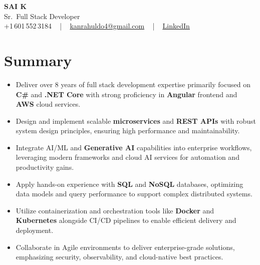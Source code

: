 \documentclass[letterpaper,11pt]{article}
\newcommand{\resumeItem}[1]{
  \item\footnotesize{
    {#1 \vspace{-2pt}}
  }
}
\newcommand{\resumeItemListStart}{\begin{itemize}[leftmargin=*]}
\newcommand{\resumeItemListEnd}{\end{itemize}\vspace{-5pt}}
\begin{document}
\begin{center}
    {\fontsize{14pt}{12pt}\selectfont \textbf{\MakeUppercase{Sai K}}}\\ \vspace{2pt}
    \fontsize{10pt}{12pt}\selectfont Sr.\ Full Stack Developer\\ \vspace{2pt}
    \fontsize{10pt}{12pt}\selectfont +1\,601\,552\,3184 ~ | ~
    \href{mailto:kanrahuldo4@gmail.com}{kanrahuldo4@gmail.com} ~ | ~
    \href{https://www.linkedin.com/in/srrrk/}{\color{blue}\underline{LinkedIn}}
    \vspace{-10pt}
\end{center}

\section{Summary}
\fontsize{9pt}{10pt}\selectfont
\resumeItemListStart
  \resumeItem{Deliver over 8 years of full stack development expertise primarily focused on \textbf{C\#} and \textbf{.NET Core} with strong proficiency in \textbf{Angular} frontend and \textbf{AWS} cloud services.}
  \resumeItem{Design and implement scalable \textbf{microservices} and \textbf{REST APIs} with robust system design principles, ensuring high performance and maintainability.}
  \resumeItem{Integrate AI/ML and \textbf{Generative AI} capabilities into enterprise workflows, leveraging modern frameworks and cloud AI services for automation and productivity gains.}
  \resumeItem{Apply hands-on experience with \textbf{SQL} and \textbf{NoSQL} databases, optimizing data models and query performance to support complex distributed systems.}
  \resumeItem{Utilize containerization and orchestration tools like \textbf{Docker} and \textbf{Kubernetes} alongside CI/CD pipelines to enable efficient delivery and deployment.}
  \resumeItem{Collaborate in Agile environments to deliver enterprise-grade solutions, emphasizing security, observability, and cloud-native best practices.}
\resumeItemListEnd
\vspace{-6pt}

\end{document}
